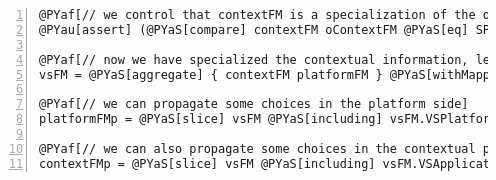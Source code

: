 \documentclass{article}
\begin{document}
\begin{Verbatim}[commandchars=@\[\],numbers=left,firstnumber=1,stepnumber=1]
@PYaf[// we control that contextFM is a specialization of the original context FM]
@PYau[assert] (@PYaS[compare] contextFM oContextFM @PYaS[eq] SPECIALIZATION)

@PYaf[// now we have specialized the contextual information, let us reason on the integrated FM		]
vsFM = @PYaS[aggregate] { contextFM platformFM } @PYaS[withMapping] prules

@PYaf[// we can propagate some choices in the platform side]
platformFMp = @PYaS[slice] vsFM @PYaS[including] vsFM.VSPlatform*

@PYaf[// we can also propagate some choices in the contextual part]
contextFMp = @PYaS[slice] vsFM @PYaS[including] vsFM.VSApplicationRequirement*
\end{Verbatim}
\end{document}

